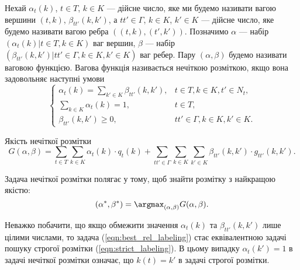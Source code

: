 Нехай $\alpha_t(k)$, $t\in T$, $k\in K$ --- дійсне число, яке ми будемо називати
вагою вершини $(t,k)$, $\beta_{tt'}(k,k')$, а $tt'\in\Gamma$, $k\in K$, $k'\in K$ --- 
дійсне число, яке будемо називати вагою ребра $((t,k),(t',k'))$. Позначимо $\alpha$ --- 
набір $(\alpha_t(k)|t\in T, k\in K)$ ваг вершин, 
$\beta$ --- набір $(\beta_{tt'}(k,k')|tt'\in\Gamma, k\in K, k'\in K)$ ваг ребер.
Пару $(\alpha, \beta)$ будемо називати ваговою функцією. Вагова функція називається
нечіткою розміткою, якщо вона задовольняє наступні умови
\begin{equation}
  \begin{cases}
    \alpha_t(k)=\sum\limits_{k' \in K} \beta_{tt'}(k,k')  , & t\in T, k\in K, t'\in N_t,\\
    \sum\limits_{k \in K} \alpha_t(k)=1, & t\in T,\\
    \beta_{tt'}(k,k')\geq 0, & tt'\in \Gamma, k\in K, k'\in K.
  \end{cases}
\end{equation}

Якість нечіткої розмітки
\begin{equation}
  G(\alpha, \beta)=\sum\limits_{t \in T}\sum\limits_{k\in K} \alpha_t(k)\cdot q_t(k) +
   \sum\limits_{tt'\in \Gamma}\sum\limits_{k\in K}\sum\limits_{k'\in K} \beta_{tt'}(k,k')\cdot g_{tt'}(k,k').
\end{equation}

Задача нечіткої розмітки полягає у тому, щоб знайти розмітку з найкращою якістю:
\begin{equation}
  (\alpha^*, \beta^*) = \argmax_{(\alpha, \beta)} G(\alpha, \beta).
  \label{eqn:best_rel_labeling}
\end{equation}

Неважко побачити, що якщо обмежити значення $\alpha_t(k)$ та $\beta_{tt'}(k,k')$
лише цілими числами, то задача (\ref{eqn:best_rel_labeling}) стає еквівалентною
задачі пошуку строгої розмітки (\ref{eqn:strict_labeling}). В цьому випадку
$\alpha_t(k')=1$ в задачі нечіткої розмітки означає, що $k(t)=k'$ в задачі строгої розмітки.
